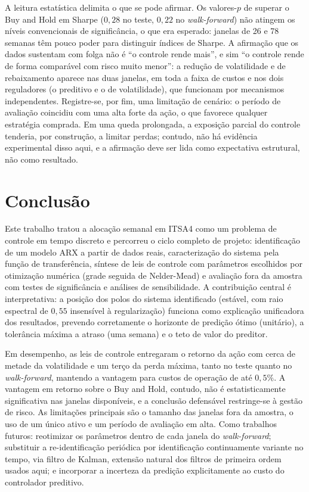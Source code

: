 \documentclass[conference]{IEEEtran}
\begin{document}
A leitura estatística delimita o que se pode afirmar. Os valores-$p$ de superar o Buy and Hold em Sharpe ($0{,}28$ no teste, $0{,}22$ no \emph{walk-forward}) não atingem os níveis convencionais de significância, o que era esperado: janelas de 26 e 78 semanas têm pouco poder para distinguir índices de Sharpe. A afirmação que os dados sustentam com folga não é ``o controle rende mais'', e sim ``o controle rende de forma comparável com risco muito menor'': a redução de volatilidade e de rebaixamento aparece nas duas janelas, em toda a faixa de custos e nos dois reguladores (o preditivo e o de volatilidade), que funcionam por mecanismos independentes. Registre-se, por fim, uma limitação de cenário: o período de avaliação coincidiu com uma alta forte da ação, o que favorece qualquer estratégia comprada. Em uma queda prolongada, a exposição parcial do controle tenderia, por construção, a limitar perdas; contudo, não há evidência experimental disso aqui, e a afirmação deve ser lida como expectativa estrutural, não como resultado.

\section{Conclusão}\label{sec:conclusao}

Este trabalho tratou a alocação semanal em ITSA4 como um problema de controle em tempo discreto e percorreu o ciclo completo de projeto: identificação de um modelo ARX a partir de dados reais, caracterização do sistema pela função de transferência, síntese de leis de controle com parâmetros escolhidos por otimização numérica (grade seguida de Nelder-Mead) e avaliação fora da amostra com testes de significância e análises de sensibilidade. A contribuição central é interpretativa: a posição dos polos do sistema identificado (estável, com raio espectral de $0{,}55$ insensível à regularização) funciona como explicação unificadora dos resultados, prevendo corretamente o horizonte de predição ótimo (unitário), a tolerância máxima a atraso (uma semana) e o teto de valor do preditor.

Em desempenho, as leis de controle entregaram o retorno da ação com cerca de metade da volatilidade e um terço da perda máxima, tanto no teste quanto no \emph{walk-forward}, mantendo a vantagem para custos de operação de até $0{,}5\%$. A vantagem em retorno sobre o Buy and Hold, contudo, não é estatisticamente significativa nas janelas disponíveis, e a conclusão defensável restringe-se à gestão de risco. As limitações principais são o tamanho das janelas fora da amostra, o uso de um único ativo e um período de avaliação em alta. Como trabalhos futuros: reotimizar os parâmetros dentro de cada janela do \emph{walk-forward}; substituir a re-identificação periódica por identificação continuamente variante no tempo, via filtro de Kalman, extensão natural dos filtros de primeira ordem usados aqui; e incorporar a incerteza da predição explicitamente ao custo do controlador preditivo.
\end{document}
